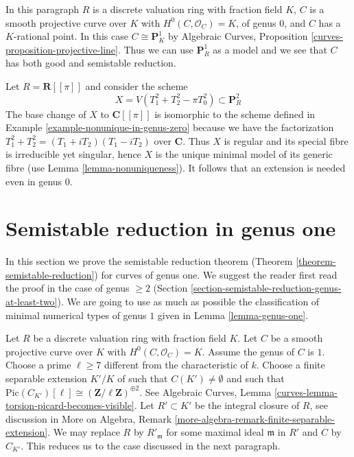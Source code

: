 \medskip\noindent
In this paragraph $R$ is a discrete valuation ring with fraction field $K$,
$C$ is a smooth projective curve over $K$ with $H^0(C, \mathcal{O}_C) = K$,
of genus $0$, and $C$ has a $K$-rational point. In this case
$C \cong \mathbf{P}^1_K$ by
Algebraic Curves, Proposition \ref{curves-proposition-projective-line}.
Thus we can use $\mathbf{P}^1_R$ as a model and we see that
$C$ has both good and semistable reduction.

\begin{example}
\label{example-extension-necessary-genus-zero}
Let $R = \mathbf{R}[[\pi]]$ and consider the scheme
$$
X = V(T_1^2 + T_2^2 - \pi T_0^2) \subset \mathbf{P}^2_R
$$
The base change of $X$ to $\mathbf{C}[[\pi]]$ is isomorphic
to the scheme defined in Example \ref{example-nonunique-in-genus-zero}
because we have the factorization $T_1^2 + T_2^2 = (T_1 + iT_2)(T_1 - iT_2)$
over $\mathbf{C}$.
Thus $X$ is regular and its special fibre is irreducible yet singular,
hence $X$ is the unique minimal model of its generic fibre
(use Lemma \ref{lemma-nonuniqueness}).
It follows that an extension is needed even in genus $0$.
\end{example}



\section{Semistable reduction in genus one}
\label{section-semistable-reduction-genus-one}

\noindent
In this section we prove the semistable reduction theorem
(Theorem \ref{theorem-semistable-reduction}) for curves of genus one.
We suggest the reader first read the proof in the case of genus $\geq 2$
(Section \ref{section-semistable-reduction-genus-at-least-two}).
We are going to use as much as possible the classification of
minimal numerical types of genus $1$ given in
Lemma \ref{lemma-genus-one}.

\medskip\noindent
Let $R$ be a discrete valuation ring with fraction field $K$.
Let $C$ be a smooth projective curve over $K$ with $H^0(C, \mathcal{O}_C) = K$.
Assume the genus of $C$ is $1$.
Choose a prime $\ell \geq 7$ different from the characteristic of $k$.
Choose a finite separable extension $K'/K$ of
such that $C(K') \not = \emptyset$ and such that
$\text{Pic}(C_{K'})[\ell] \cong (\mathbf{Z}/\ell \mathbf{Z})^{\oplus 2}$.
See
Algebraic Curves, Lemma \ref{curves-lemma-torsion-picard-becomes-visible}.
Let $R' \subset K'$ be the integral closure of $R$, see
discussion in More on Algebra, Remark
\ref{more-algebra-remark-finite-separable-extension}.
We may replace $R$ by $R'_{\mathfrak m}$ for some maximal ideal
$\mathfrak m$ in $R'$ and $C$ by $C_{K'}$. This
reduces us to the case discussed in the next paragraph.

